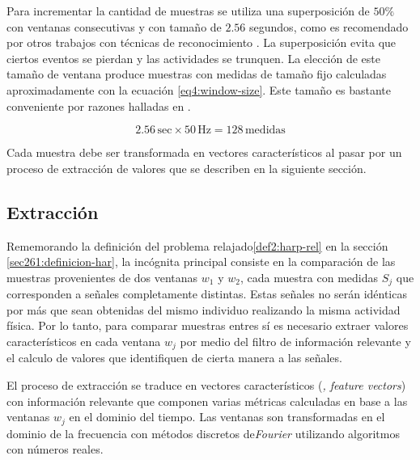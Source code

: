 Para incrementar la cantidad de muestras se utiliza una superposición
de $50\%$ con ventanas consecutivas y con tamaño de $2.56$ segundos,
como es recomendado por otros trabajos con técnicas de reconocimiento
\cite{Bao2004,ReyesOrtiz2015}. La superposición evita que ciertos
eventos se pierdan y las actividades se trunquen. La elección de este
tamaño de ventana produce muestras con medidas de tamaño fijo calculadas
aproximadamente con la ecuación \ref{eq4:window-size}. Este tamaño
es bastante conveniente por razones halladas en \cite{ReyesOrtiz2015}.

\begin{equation}
2.56\,\mathrm{sec}\times50\mathrm{\,Hz}=128\,\mathrm{medidas}\label{eq4:window-size}
\end{equation}

Cada muestra debe ser transformada en vectores característicos al
pasar por un proceso de extracción de valores que se describen en
la siguiente sección.

\subsection{Extracción}

\label{ssec44:extraction}Rememorando la definición del problema relajado\ref{def2:harp-rel}
en la sección \ref{sec261:definicion-har}, la incógnita principal
consiste en la comparación de las muestras provenientes de dos ventanas
$w_{1}$ y $w_{2}$, cada muestra con medidas $S_{j}$ que corresponden
a señales completamente distintas. Estas señales no serán idénticas
por más que sean obtenidas del mismo individuo realizando la misma
actividad física. Por lo tanto, para comparar muestras entres sí es
necesario extraer valores característicos en cada ventana $w_{j}$
por medio del filtro de información relevante y el calculo de valores
que identifiquen de cierta manera a las señales. 

El proceso de extracción se traduce en vectores característicos (\emph{,
feature vectors}) con información relevante que componen varias métricas
calculadas en base a las ventanas $w_{j}$ en el dominio del tiempo.
Las ventanas son transformadas en el dominio de la frecuencia con
métodos discretos de\emph{Fourier} utilizando algoritmos 
con números reales. 

